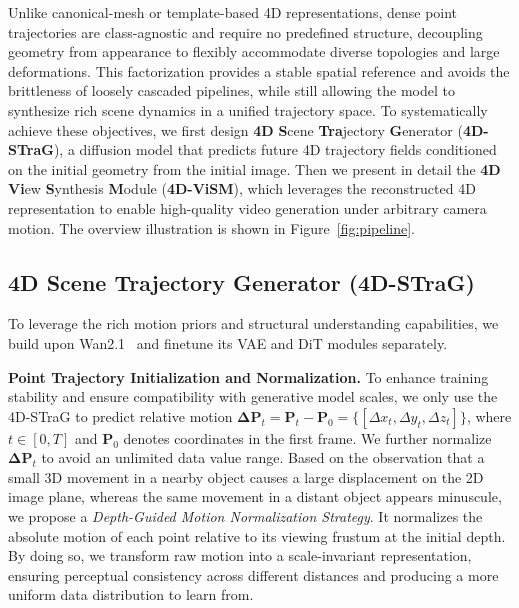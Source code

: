 Unlike canonical-mesh or template-based 4D representations, dense point trajectories are class-agnostic and require no predefined structure, decoupling geometry from appearance to flexibly accommodate diverse topologies and large deformations. This factorization provides a stable spatial reference and avoids the brittleness of loosely cascaded pipelines, while still allowing the model to synthesize rich scene dynamics in a unified trajectory space.
To systematically achieve these objectives, we first design \textbf{4D} \textbf{S}cene \textbf{Tra}jectory \textbf{G}enerator (\textbf{4D-STraG}), a diffusion model that predicts future 4D trajectory fields conditioned on the initial geometry from the initial image. Then we present in detail the \textbf{4D} \textbf{Vi}ew \textbf{S}ynthesis \textbf{M}odule (\textbf{4D-ViSM}), which leverages the reconstructed 4D representation to enable high-quality video generation under arbitrary camera motion. The overview illustration is shown in Figure~\ref{fig:pipeline}.

\subsection{ \textbf{4D} \textbf{S}cene \textbf{Tra}jectory \textbf{G}enerator (4D-STraG)}
\label{sec:4D-STraG}
 
To leverage the rich motion priors and structural understanding capabilities, we build upon Wan2.1~\cite{wan2025wan} and finetune its VAE and DiT modules separately.


\vspace{3pt}
\noindent\textbf{Point Trajectory Initialization and Normalization.}
To enhance training stability and ensure compatibility with generative model scales, we only use the 4D-STraG to predict relative motion $\mathbf{\Delta P}_t = \mathbf{P}_t - \mathbf{P}_0=\{[\Delta{x}_t,\Delta{y}_t,\Delta{z}_t]\}$, where $t \in [0, T]$ and $\mathbf{P}_0$ denotes coordinates in the first frame. We further normalize $\mathbf{\Delta P}_t$ to avoid an unlimited data value range. Based on the observation that a small 3D movement in a nearby object causes a large displacement on the 2D image plane, whereas the same movement in a distant object appears minuscule, we propose a \textit{Depth-Guided Motion Normalization Strategy}. It normalizes the absolute motion of each point relative to its viewing frustum at the initial depth. By doing so, we transform raw motion into a scale-invariant representation, ensuring perceptual consistency across different distances and producing a more uniform data distribution to learn from.

